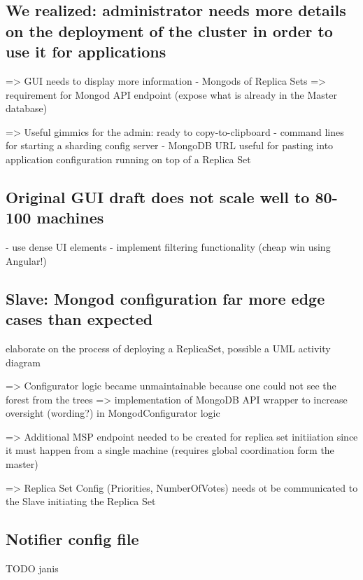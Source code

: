 \subsection{We realized: administrator needs more details on the deployment of the cluster in order to use it for applications}

=> GUI needs to display more information
    - Mongods of Replica Sets
    => requirement for Mongod API endpoint (expose what is already in the Master database)

=> Useful gimmics for the admin: ready to copy-to-clipboard 
    - command lines for starting a sharding config server
    - MongoDB URL useful for pasting into application configuration running on top of a Replica Set

\subsection{Original GUI draft does not scale well to 80-100 machines }

- use dense UI elements
- implement filtering functionality (cheap win using Angular!)

\subsection{Slave: Mongod configuration far more edge cases than expected}

elaborate on the process of deploying a ReplicaSet, possible a UML activity diagram

=> Configurator logic became unmaintainable because one could not see the forest from the trees
  => implementation of MongoDB API wrapper to increase oversight (wording?) in MongodConfigurator logic

=> Additional MSP endpoint needed to be created for replica set initiiation since it must happen from a single machine
   (requires global coordination form the master)

  => Replica Set Config (Priorities, NumberOfVotes) needs ot be communicated to the Slave initiating the Replica Set

\subsection{Notifier config file}

TODO janis
